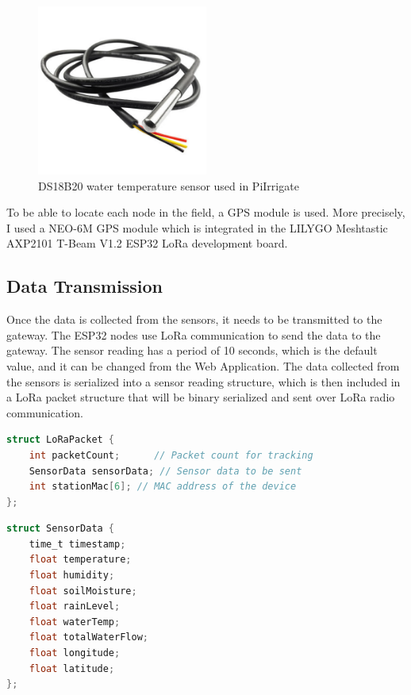\begin{figure}[H]
    \centering
    \includegraphics[width=0.5\textwidth]{images/water-temp.png}
    \caption{DS18B20 water temperature sensor used in PiIrrigate}
    \label{fig:ds18b20}
\end{figure}

To be able to locate each node in the field, a GPS module is used. More precisely, I used a NEO-6M GPS module
which is integrated in the LILYGO Meshtastic AXP2101 T-Beam V1.2 ESP32 LoRa development board.

\subsection {Data Transmission}
Once the data is collected from the sensors, it needs to be transmitted to the gateway.
The ESP32 nodes use LoRa communication to send the data to the gateway. 
The sensor reading has a period of 10 seconds, which is the default value, and it can be changed from the Web Application.
The data collected from the sensors is serialized into a sensor reading structure, 
which is then included in a LoRa packet structure that will be 
binary serialized and sent over LoRa radio communication.
\begin{lstlisting}[language=C, caption={LoRa packet structure}]
struct LoRaPacket {
    int packetCount;      // Packet count for tracking
    SensorData sensorData; // Sensor data to be sent
    int stationMac[6]; // MAC address of the device
};
\end{lstlisting}

\begin{lstlisting}[language=C, caption={Sensor reading structure}]
struct SensorData {
    time_t timestamp;
    float temperature;
    float humidity;
    float soilMoisture;
    float rainLevel;
    float waterTemp;
    float totalWaterFlow;
    float longitude;
    float latitude;
};
\end{lstlisting}


